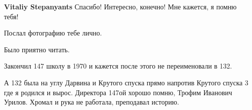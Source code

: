 \begin{itemize}
\begin{itemize} %
\textbf{Vitaliy Stepanyants} Спасибо! Интересно, конечно! Мне кажется, я помню тебя!

Послал фотографию тебе лично.
\end{itemize} %


Было приятно читать.

Закончил 147 школу в 1970 и кажется после этого не переименовали в 132.

А 132 была на углу Дарвина и Крутого спуска прямо напротив Крутого спуска 3 где
я родился и вырос.  Директора 147ой хорошо помню, Трофим Иванович Урилов.
Хромал и рука не работала, преподавал историю.


\end{itemize} %
